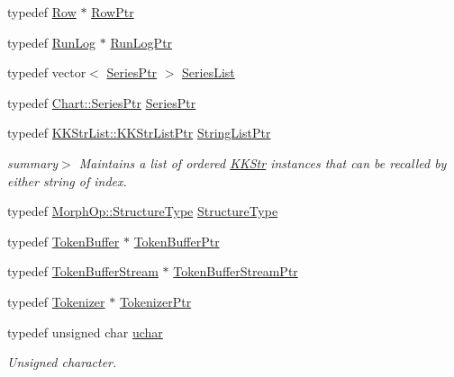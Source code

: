 \begin{DoxyCompactItemize}
\item 
typedef \hyperlink{class_k_k_b_1_1_row}{Row} $\ast$ \hyperlink{namespace_k_k_b_aac521e443a612a7e8cdda6d5a451e944}{Row\+Ptr}
\item 
typedef \hyperlink{class_k_k_b_1_1_run_log}{Run\+Log} $\ast$ \hyperlink{namespace_k_k_b_a2fe464c953e535e4b50cf3e4527ad22f}{Run\+Log\+Ptr}
\item 
typedef vector$<$ \hyperlink{namespace_k_k_b_afbd510d7c1f234756a7bcbe080f48f45}{Series\+Ptr} $>$ \hyperlink{namespace_k_k_b_a3f1b2c85e1ffd8e8848130542adf4033}{Series\+List}
\item 
typedef \hyperlink{class_k_k_b_1_1_chart_aa47e1a77836cdfb0cfbd1409a02edd97}{Chart\+::\+Series\+Ptr} \hyperlink{namespace_k_k_b_afbd510d7c1f234756a7bcbe080f48f45}{Series\+Ptr}
\item 
typedef \hyperlink{class_k_k_b_1_1_k_k_str_list_a466accb870aa75f4b47943932fccb4c8}{K\+K\+Str\+List\+::\+K\+K\+Str\+List\+Ptr} \hyperlink{namespace_k_k_b_a8a9b957cedcc26019cc08c75bfc15070}{String\+List\+Ptr}
\begin{DoxyCompactList}\small\item\em summary$>$ Maintains a list of ordered \hyperlink{class_k_k_b_1_1_k_k_str}{K\+K\+Str} instances that can be recalled by either string of index. \end{DoxyCompactList}\item 
typedef \hyperlink{class_k_k_b_1_1_morph_op_a09e4aff7e81327849855ff72082d85b3}{Morph\+Op\+::\+Structure\+Type} \hyperlink{namespace_k_k_b_a566736d34bed362968fc3667773412f9}{Structure\+Type}
\item 
typedef \hyperlink{class_k_k_b_1_1_token_buffer}{Token\+Buffer} $\ast$ \hyperlink{namespace_k_k_b_ae97804d25124b4a5dba3b3637beb814a}{Token\+Buffer\+Ptr}
\item 
typedef \hyperlink{class_k_k_b_1_1_token_buffer_stream}{Token\+Buffer\+Stream} $\ast$ \hyperlink{namespace_k_k_b_a7b9e0f7d3915b925553f0dd6afcfcaf6}{Token\+Buffer\+Stream\+Ptr}
\item 
typedef \hyperlink{class_k_k_b_1_1_tokenizer}{Tokenizer} $\ast$ \hyperlink{namespace_k_k_b_a73e00654d0cf80b7f86c64d9be4b8aa8}{Tokenizer\+Ptr}
\item 
typedef unsigned char \hyperlink{namespace_k_k_b_ace9969169bf514f9ee6185186949cdf7}{uchar}
\begin{DoxyCompactList}\small\item\em Unsigned character. \end{DoxyCompactList}\item 

\end{DoxyCompactItemize}
